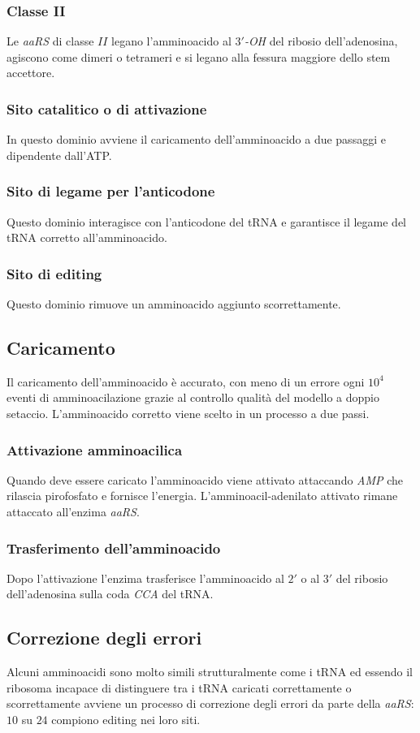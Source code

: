 \subsubsection{Classe II}
Le \emph{aaRS} di classe $II$ legano l'amminoacido al \emph{$3'$-OH} del ribosio dell'adenosina, agiscono come dimeri o tetrameri e si legano alla fessura maggiore dello stem accettore. 
\subsubsection{Sito catalitico o di attivazione}
In questo dominio avviene il caricamento dell'amminoacido a due passaggi e dipendente dall'ATP.
\subsubsection{Sito di legame per l'anticodone}
Questo dominio interagisce con l'anticodone del tRNA e garantisce il legame del tRNA corretto all'amminoacido.
\subsubsection{Sito di editing}
Questo dominio rimuove un amminoacido aggiunto scorrettamente. 
\subsection{Caricamento}
Il caricamento dell'amminoacido \`e accurato, con meno di un errore ogni $10^4$ eventi di amminoacilazione grazie al controllo qualit\`a del modello a doppio setaccio. L'amminoacido corretto 
viene scelto in un processo a due passi.
\subsubsection{Attivazione amminoacilica}
Quando deve essere caricato l'amminoacido viene attivato attaccando \emph{AMP} che rilascia pirofosfato e fornisce l'energia. L'amminoacil-adenilato attivato rimane attaccato all'enzima \emph{aaRS}. 
\subsubsection{Trasferimento dell'amminoacido}
Dopo l'attivazione l'enzima trasferisce l'amminoacido al $2'$ o al $3'$ del ribosio dell'adenosina sulla coda \emph{CCA} del tRNA.
\subsection{Correzione degli errori}
Alcuni amminoacidi sono molto simili strutturalmente come i tRNA ed essendo il ribosoma incapace di distinguere tra i tRNA caricati correttamente o scorrettamente avviene un processo di correzione
degli errori da parte della \emph{aaRS}: $10$ su $24$ compiono editing nei loro siti.
